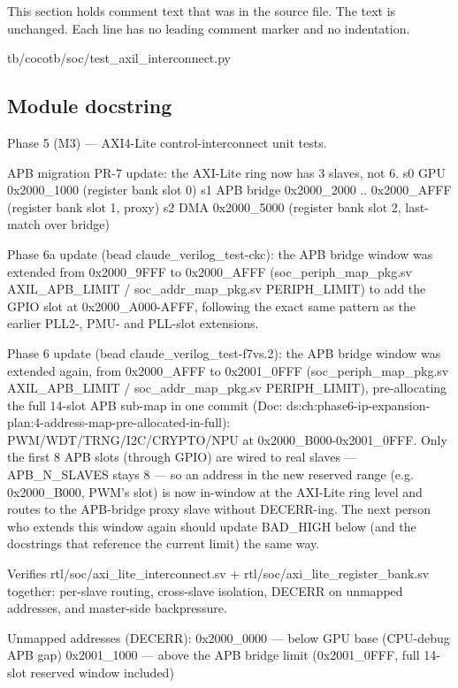 This section holds comment text that was in the source file. The text is unchanged. Each line has no leading comment marker and no indentation.

\begin{relocated}{tb/cocotb/soc/test_axil_interconnect.py}

\subsection*{Module docstring}

\begin{textblock}
Phase 5 (M3) — AXI4-Lite control-interconnect unit tests.

APB migration PR-7 update: the AXI-Lite ring now has 3 slaves, not 6.
s0 GPU         0x2000_1000 (register bank slot 0)
s1 APB bridge  0x2000_2000 .. 0x2000_AFFF (register bank slot 1, proxy)
s2 DMA         0x2000_5000 (register bank slot 2, last-match over bridge)

Phase 6a update (bead claude_verilog_test-ckc): the APB bridge window was
extended from 0x2000_9FFF to 0x2000_AFFF (soc_periph_map_pkg.sv
AXIL_APB_LIMIT / soc_addr_map_pkg.sv PERIPH_LIMIT) to add the GPIO slot at
0x2000_A000-AFFF, following the exact same pattern as the earlier PLL2-, PMU-
and PLL-slot extensions.

Phase 6 update (bead claude_verilog_test-f7vs.2): the APB bridge window was
extended again, from 0x2000_AFFF to 0x2001_0FFF (soc_periph_map_pkg.sv
AXIL_APB_LIMIT / soc_addr_map_pkg.sv PERIPH_LIMIT), pre-allocating the full
14-slot APB sub-map in one commit (Doc: ds:ch:phase6-ip-expansion-plan:4-address-map-pre-allocated-in-full):
PWM/WDT/TRNG/I2C/CRYPTO/NPU at 0x2000_B000-0x2001_0FFF. Only the first 8 APB
slots (through GPIO) are wired to real slaves — APB_N_SLAVES stays 8 — so an
address in the new reserved range (e.g. 0x2000_B000, PWM's slot) is now
in-window at the AXI-Lite ring level and routes to the APB-bridge proxy slave
without DECERR-ing. The next person who extends this window again should
update BAD_HIGH below (and the docstrings that reference the current limit)
the same way.

Verifies rtl/soc/axi_lite_interconnect.sv + rtl/soc/axi_lite_register_bank.sv
together: per-slave routing, cross-slave isolation, DECERR on unmapped
addresses, and master-side backpressure.

Unmapped addresses (DECERR):
0x2000_0000 — below GPU base (CPU-debug APB gap)
0x2001_1000 — above the APB bridge limit (0x2001_0FFF, full 14-slot
reserved window included)


\end{textblock}
\end{relocated}
